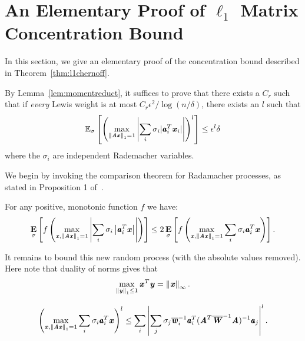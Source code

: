 
\section{An Elementary Proof of $\ell_1$ Matrix Concentration Bound}
\label{sec:concentration}

In this section, we give an elementary proof of the concentration bound
described in Theorem~\ref{thm:l1chernoff}.

\lonechernoff*

By Lemma~\ref{lem:momentreduct}, it suffices to prove that there exists a $C_r$ such that
if \emph{every} Lewis weight is at most $C_r \epsilon^2 / \log(n / \delta)$, there exists an $l$ such that
\begin{equation*}
{\mathbb{E}}_{\sigma}\left[ \left (\max_{\left\| \boldsymbol{\mathit{A}} \boldsymbol{\mathit{x}} \right\|_1 = 1} \left | \sum_i \sigma_i |\pmb{\mathit{a}}_i^T \boldsymbol{\mathit{x}}_i| \right | \right )^l \right] \leq \epsilon^l \delta
\end{equation*}
where the $\sigma_i$ are independent Rademacher variables.


We begin by invoking the comparison theorem for Radamacher processes,
as stated in Proposition 1 of~\cite{LedouxT89}.

\begin{lemma}
\label{lem:comparison}
For any positive, monotonic function $f$ we have:
\begin{equation*}
\mathop{\text{\normalfont \textbf{E}}}_{\sigma}\left[ f \left( \max_{\boldsymbol{\mathit{x}}, \left\| \boldsymbol{\mathit{A}} \boldsymbol{\mathit{x}} \right\|_1 = 1 } \left|\sum_i \sigma_i \left|\pmb{\mathit{a}}_{i}^T \boldsymbol{\mathit{x}}  \right| \right| \right)\right]
\leq 2 \mathop{\text{\normalfont \textbf{E}}}_{\sigma}\left[  f \left( \max_{\boldsymbol{\mathit{x}}, \left\| \boldsymbol{\mathit{A}} \boldsymbol{\mathit{x}} \right\|_1 = 1 } \sum_i \sigma_i \pmb{\mathit{a}}_{i}^T \boldsymbol{\mathit{x}} \right) \right].
\end{equation*}
\end{lemma}


It remains to bound this new random process (with the absolute values removed).
Here note that duality of norms gives that
\begin{equation*}
\max_{\left\| \boldsymbol{\mathit{y}} \right\|_{1} \leq 1} \boldsymbol{\mathit{x}}^T \boldsymbol{\mathit{y}}
= \left\| \boldsymbol{\mathit{x}} \right\|_{\infty}.
\end{equation*}

\begin{lemma}
\label{lem:lewlinf}

\begin{equation*}
\left( \max_{\boldsymbol{\mathit{x}}, \left\| \boldsymbol{\mathit{A}} \boldsymbol{\mathit{x}} \right\|_1 = 1} \sum_i \sigma_i \pmb{\mathit{a}}_i^T \boldsymbol{\mathit{x}} \right)^{l}
\leq \sum_i \left | \sum_j \sigma_j
\overline{\boldsymbol{\mathit{w}}}_i^{-1} \pmb{\mathit{a}}_i^T ( \boldsymbol{\mathit{A}}^T \overline{\boldsymbol{\mathit{W}}}^{-1} \boldsymbol{\mathit{A}} )^{-1} \pmb{\mathit{a}}_j \right |^l .
\end{equation*}

\end{lemma}

